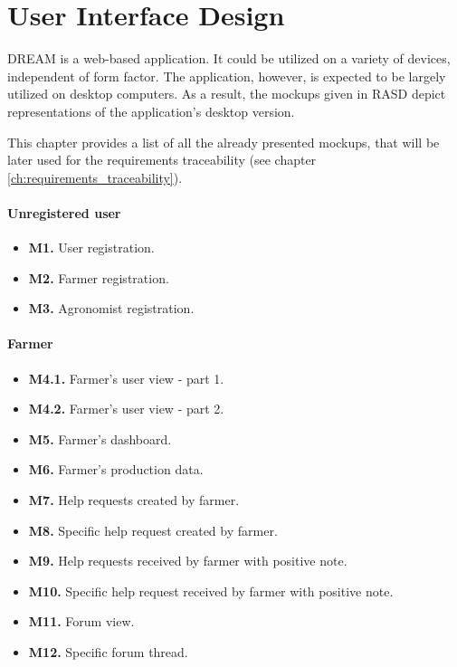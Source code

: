 \chapter{User Interface Design}

DREAM is a web-based application. It could be utilized on a variety of devices, independent of form factor. The application, however, is expected to be largely utilized on desktop computers. As a result, the mockups given in RASD depict representations of the application's desktop version.

This chapter provides a list of all the already presented mockups, that will be later used for the requirements traceability (see chapter \ref{ch:requirements_traceability}).

\subsubsection{Unregistered user}

\begin{itemize}
    \item \textbf{M1.} User registration.
    \item \textbf{M2.} Farmer registration.
    \item \textbf{M3.} Agronomist registration.
\end{itemize}

\subsubsection{Farmer}

\begin{itemize}
    \item \textbf{M4.1.} Farmer's user view - part 1.
    \item \textbf{M4.2.} Farmer's user view - part 2.
    \item \textbf{M5.} Farmer's dashboard.
    \item \textbf{M6.} Farmer's production data.
    \item \textbf{M7.} Help requests created by farmer.
    \item \textbf{M8.} Specific help request created by farmer.
    \item \textbf{M9.} Help requests received by farmer with positive note.
    \item \textbf{M10.} Specific help request received by farmer with positive note.
    \item \textbf{M11.} Forum view.
    \item \textbf{M12.} Specific forum thread.
\end{itemize}

